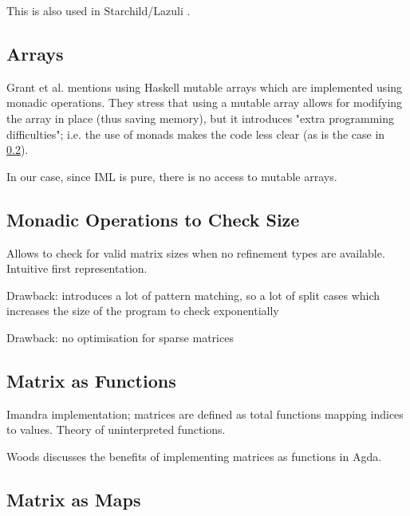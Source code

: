 \documentclass[runningheads]{llncs}
\begin{document}
This is also used in Starchild/Lazuli \cite{kokke_neural_2020}.


\subsection{Arrays}
Grant et al. \cite{grant_sparse_1996} mentions using Haskell mutable arrays which are implemented using monadic operations. They stress that using a mutable array allows for modifying the array in place (thus saving memory), but it introduces "extra programming difficulties"; i.e. the use of monads makes the code less clear (as is the case in \ref{subs:monads}). 

In our case, since IML is pure, there is no access to mutable arrays.

\subsection{Monadic Operations to Check Size} \label{subs:monads}
Allows to check for valid matrix sizes when no refinement types are available. Intuitive first representation.

Drawback: introduces a lot of pattern matching, so a lot of split cases which increases the size of the program to check exponentially

Drawback: no optimisation for sparse matrices

\subsection{Matrix as Functions}
Imandra implementation; matrices are defined as total functions mapping indices to values.
Theory of uninterpreted functions.

Woods \cite{wood_vectors_2019} discusses the benefits of implementing matrices as functions in Agda.

\subsection{Matrix as Maps}

%
%
%


\end{document}
